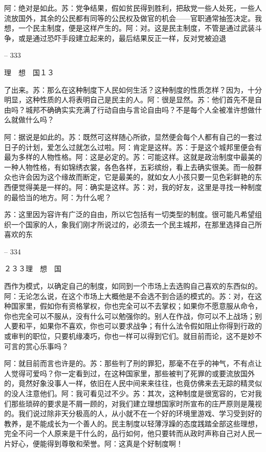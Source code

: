 \documentclass[11pt,oneside]{book}
\begin{document}
\begin{common-format}
    阿：绝对是如此。苏：党争结果，假如贫民得到胜利，把敌党一些人处死，一些人流放国外，其余的公民都有同等的公民权及做官的机会——官职通常抽签决定。我想，一个民主制度，便是这样产生的。阿：对。这是民主制度，不管是通过武装斗争，或是通过恐吓手段建立起来的，最后结果反正一样，反对党被迫退

    

-- 333

    理　想　国１３

    了出来。苏：那么在这种制度下人民如何生活？这种制度的性质怎样？因为，十分明显，这种性质的人将表明自己是民主的人。阿：很是显然。苏：他们首先不是自由吗？城邦不确确实实充满了行动自由与言论自由吗？不是每个人全被准许想做什么就做什么吗？

    阿：据说是如此的。苏：既然可这样随心所欲，显然便会每个人都有自己的一套过日子的计划，爱怎么过就怎么过啦。阿：肯定是这样。苏：于是这个城邦里便会有最为多样的人物性格。阿：这是必定的。苏：可能这样。这就是政治制度中最美的一种人物性格，有如锦绣衣裳，各色各样，五彩缤纷，看上去确实很美。而一般群众也许会因为这个缘故而断定，它是最美的，就如女人小孩只要一见色彩鲜艳的东西便觉得美是一样的。阿：确实是这样。苏：对，我的好友，这里是寻找一种制度的最恰当的地方。阿：为什么呢？

    苏：这里因为容许有广泛的自由，所以它包括有一切类型的制度。很可能凡希望组织一个国家的人，象我们刚才所说过的，必须去一个民主城邦，在那里选择自己所喜欢的东

    

-- 334

    ２３３理　想　国

    西作为模式，以确定自己的制度，如同到一个市场上去选购自己喜欢的东西似的。阿：无论怎么说，在这个市场上大概他是不会选不到合适的模式的。苏：对，在这种国家里，假如你有资格掌权，你也完全可以不去掌权；如果你不愿意服从命令，你也完全可以不服从，没有什么可以勉强你的。别人在作战，你可以不上战场；别人要和平，如果你不喜欢，你也可以要求战争；有什么法令假如阻止你得到行政的或审判的职位，只要机缘凑巧，你也一样可以得到它们。就目前而论，这不是妙不可言的赏心乐事吗？

    阿：就目前而言也许是的。苏：那些判了刑的罪犯，那毫不在乎的神气，不有点让人觉得可爱吗？你一定看到过，在这种国家里，那些被判了死罪的或要流放国外的，竟然好象没事人一样，依旧在人民中间来来往往，也竟仿佛来去无踪的精灵似的没人注意他们。阿：我可看见过不少。苏：其次，这种制度是很宽容的，它对我们那些琐碎的要求是不屑一顾的，对我们建立理想国家时所宣布的庄严原则是蔑视的。我们说过除非天分极高的人，从小就不在一个好的环境里游戏、学习受到好的教养，是不能成长为一个善人的。民主制度以轻薄浮躁的态度践踏全部这些理想，完全不问一个人原来是干什么的，品行如何，他只要转而从政时声称自己对人民一片好心，便能得到尊敬和荣誉。阿：这真是个好制度啊！


\end{common-format}
\end{document}
